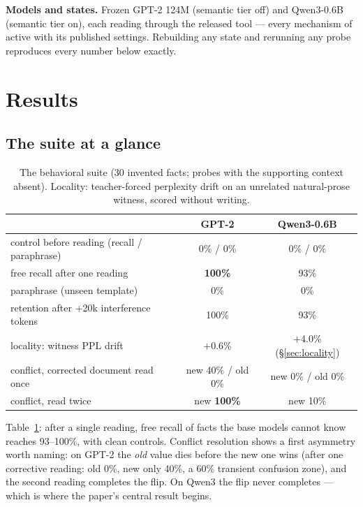 \documentclass[11pt]{article}
\begin{document}
\textbf{Models and states.} Frozen GPT-2 124M \cite{gpt2} (semantic tier off) and Qwen3-0.6B \cite{qwen3} (semantic tier on), each reading through the released tool --- every mechanism of \cite{sillage,router,hier,fw} active with its published settings. Rebuilding any state and rerunning any probe reproduces every number below exactly.

\section{Results}

\subsection{The suite at a glance}\label{sec:glance}

\begin{table}[t]
\centering\small
\caption{The behavioral suite (30 invented facts; probes with the supporting context absent). Locality: teacher-forced perplexity drift on an unrelated natural-prose witness, scored without writing.}
\label{tab:suite}
\begin{tabular}{@{}lcc@{}}
\toprule
& GPT-2 & Qwen3-0.6B\\
\midrule
control before reading (recall / paraphrase) & 0\% / 0\% & 0\% / 0\%\\
free recall after one reading & \textbf{100\%} & 93\%\\
paraphrase (unseen template) & 0\% & 0\%\\
retention after $+$20k interference tokens & 100\% & 93\%\\
locality: witness PPL drift & $+$0.6\% & $+$4.0\% (\S\ref{sec:locality})\\
conflict, corrected document read once & new 40\% / old 0\% & new 0\% / old 0\%\\
conflict, read twice & new \textbf{100\%} & new 10\%\\
\bottomrule
\end{tabular}
\end{table}

Table~\ref{tab:suite}: after a single reading, free recall of facts the base models cannot know reaches 93--100\%, with clean controls. Conflict resolution shows a first asymmetry worth naming: on GPT-2 the \emph{old} value dies before the new one wins (after one corrective reading: old 0\%, new only 40\%, a 60\% transient confusion zone), and the second reading completes the flip. On Qwen3 the flip never completes --- which is where the paper's central result begins.
\end{document}
